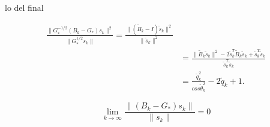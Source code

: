 \documentclass[12pt]{article}
\begin{document}
lo del final

\[
\begin{split}
\frac{ \| G_{*} ^{-1/2} (B_k - G_{*}) s_k \|^2 }{ \|  G_{*} ^{1/2} s_k \|} = \frac{ \| (\tilde{B}_{k} - I) \tilde{s}_{k} \|^2 }{ \|  \tilde{s}_{k} \|^2} \\
& = \frac{ \| \tilde{B}_{k} \tilde{s}_{k} \|^2 - 2 \tilde{s}_{k}^T \tilde{B}_{k} \tilde{s}_{k} + \tilde{s}_{k}^T \tilde{s}_{k} }{ \tilde{s}_{k}^T  \tilde{s}_{k}} \\
& = \frac{\tilde{q}_{k} ^2 }{ cos \tilde{\theta}_{k}^2 } - 2 \tilde{q}_{k} + 1.
\end{split}
\]

\[
  \lim_{k \to \infty} \frac{\| (B_k - G_{*}) s_k \|}{\| s_k \|} = 0
\]


 
\end{document}
